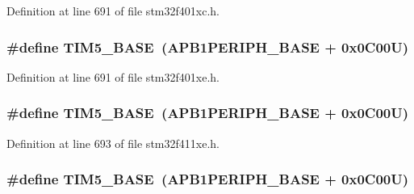 Definition at line 691 of file stm32f401xc.\+h.

\subsubsection[{\texorpdfstring{T\+I\+M5\+\_\+\+B\+A\+SE}{TIM5_BASE}}]{\setlength{\rightskip}{0pt plus 5cm}\#define T\+I\+M5\+\_\+\+B\+A\+SE~({\bf A\+P\+B1\+P\+E\+R\+I\+P\+H\+\_\+\+B\+A\+SE} + 0x0\+C00\+U)}\hypertarget{group___peripheral__registers__structures_ga3e1671477190d065ba7c944558336d7e}{}\label{group___peripheral__registers__structures_ga3e1671477190d065ba7c944558336d7e}


Definition at line 691 of file stm32f401xe.\+h.

\subsubsection[{\texorpdfstring{T\+I\+M5\+\_\+\+B\+A\+SE}{TIM5_BASE}}]{\setlength{\rightskip}{0pt plus 5cm}\#define T\+I\+M5\+\_\+\+B\+A\+SE~({\bf A\+P\+B1\+P\+E\+R\+I\+P\+H\+\_\+\+B\+A\+SE} + 0x0\+C00\+U)}\hypertarget{group___peripheral__registers__structures_ga3e1671477190d065ba7c944558336d7e}{}\label{group___peripheral__registers__structures_ga3e1671477190d065ba7c944558336d7e}


Definition at line 693 of file stm32f411xe.\+h.

\subsubsection[{\texorpdfstring{T\+I\+M5\+\_\+\+B\+A\+SE}{TIM5_BASE}}]{\setlength{\rightskip}{0pt plus 5cm}\#define T\+I\+M5\+\_\+\+B\+A\+SE~({\bf A\+P\+B1\+P\+E\+R\+I\+P\+H\+\_\+\+B\+A\+SE} + 0x0\+C00\+U)}\hypertarget{group___peripheral__registers__structures_ga3e1671477190d065ba7c944558336d7e}{}\label{group___peripheral__registers__structures_ga3e1671477190d065ba7c944558336d7e}


